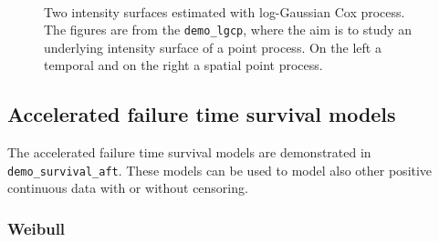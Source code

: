 \documentclass[twoside,11pt]{article}
\newcommand{\code}[1]{{\normalfont\texttt{#1}}}
\begin{document}
\begin{figure}[]
  \begin{center}
    ~
    \caption[]{Two intensity surfaces estimated with log-Gaussian Cox
      process. The figures are from the \code{demo\_lgcp}, where the
      aim is to study an underlying intensity surface of a point
      process. On the left a temporal and on the right a spatial point
      process.}\label{fig_demo_lgcp}
  \end{center}
\end{figure}

\subsection{Accelerated failure time survival models}

The accelerated failure time survival models are demonstrated in
\code{demo\_survival\_aft}. These models can be used to model also
other positive continuous data with or without censoring.

\subsubsection{Weibull}
\label{sec_weibull_demo}
\end{document}
